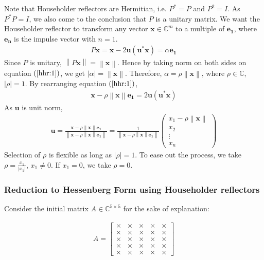 \documentclass[12pt]{article}
\newcommand{\vecb}[1]{\mathbf{#1}}
\newcommand{\brak}[1]{\ensuremath{\left(#1\right)}}
\newcommand{\defmat}[2]{#1\in\mathbb{C}^{#2\times#2}}
\newcommand{\defvec}[2]{\vecb{#1}\in\mathbb{C}^{#2}}
\newcommand{\abs}[1]{\left\vert#1\right\vert}
\newcommand{\norm}[1]{\left\lVert#1\right\rVert}
\begin{document}
Note that Householder reflectors are Hermitian, i.e. $P^{\ast} = P$ and $P^2 = I$. As $P^{\ast}P = I$, we also come to the conclusion
that $P$ is a unitary matrix.
\newline
We want the Householder reflector to transform any vector $\defvec{x}{m}$ to a multiple of $\vecb{e_1}$, where $\vecb{e_n}$ is the impulse vector with $n = 1$.
\begin{align}
\label{hhr:1}
    P\vecb{x} = \vecb{x} - 2\vecb{u}\brak{\vecb{u^{\ast}}\vecb{x}} = \alpha \vecb{e_1}
\end{align}
Since $P$ is unitary, $\norm{P\vecb{x}} = \norm{\vecb{x}}$.
\newline
Hence by taking norm on both sides on equation \brak{\ref{hhr:1}}, we get $\abs{\alpha} = \norm{\vecb{x}}$. Therefore, $\alpha = \rho\norm{\vecb{x}}$, where $\rho \in \mathbb{C}$, $\abs{\rho} = 1$. 
\newline
By rearranging equation \brak{\ref{hhr:1}},
\begin{align}
    \vecb{x} - \rho\norm{\vecb{x}}\vecb{e_1} = 2\vecb{u}\brak{\vecb{u^{\ast}}\vecb{x}}
\end{align}
As $\vecb{u}$ is unit norm,
\begin{align}
\label{hhr:2}
    \vecb{u} = \frac{\vecb{x} - \rho\norm{\vecb{x}}\vecb{e_1}}{\norm{\vecb{x} - \rho\norm{\vecb{x}}\vecb{e_1}}} = \frac{1}{\norm{\vecb{x} - \rho\norm{\vecb{x}}\vecb{e_1}}} \begin{pmatrix} x_1 - \rho\norm{\vecb{x}}\\x_2\\\vdots\\x_n\end{pmatrix}
\end{align}
Selection of $\rho$ is flexible as long as $\abs{\rho} = 1$. To ease out the process, we take $\rho = \frac{x_1}{\abs{x_1}}$, $x_1 \neq 0$. If $x_1 = 0$, we take $\rho = 0$.

\subsubsection{Reduction to Hessenberg Form using Householder reflectors}
Consider the initial matrix $\defmat{A}{5}$ for the sake of explanation:

\begin{align}
A = \begin{bmatrix}
\times & \times & \times & \times & \times\\
\times & \times & \times & \times & \times\\
\times & \times & \times & \times & \times\\
\times & \times & \times & \times & \times\\
\times & \times & \times & \times & \times
\end{bmatrix}
\end{align}
\end{document}
